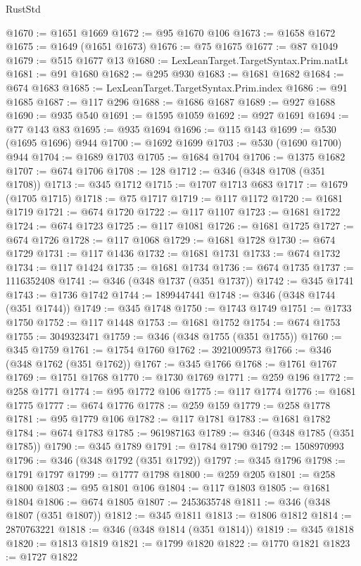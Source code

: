 \begin{lexlean}{RustStd}
\begin{coremodule}
@1670 := @1651 @1669
@1672 := @95 @1670 @106
@1673 := @1658 @1672
@1675 := @1649 (@1651 @1673)
@1676 := @75 @1675
@1677 := @87 @1049
@1679 := @515 @1677 @13
@1680 := LexLeanTarget.TargetSyntax.Prim.natLt
@1681 := @91 @1680
@1682 := @295 @930
@1683 := @1681 @1682
@1684 := @674 @1683
@1685 := LexLeanTarget.TargetSyntax.Prim.index
@1686 := @91 @1685
@1687 := @117 @296
@1688 := @1686 @1687
@1689 := @927 @1688
@1690 := @935 @540
@1691 := @1595 @1059
@1692 := @927 @1691
@1694 := @77 @143 @83
@1695 := @935 @1694
@1696 := @115 @143
@1699 := @530 (@1695 @1696) @944
@1700 := @1692 @1699
@1703 := @530 (@1690 @1700) @944
@1704 := @1689 @1703
@1705 := @1684 @1704
@1706 := @1375 @1682
@1707 := @674 @1706
@1708 := 128
@1712 := @346 (@348 @1708 (@351 @1708))
@1713 := @345 @1712
@1715 := @1707 @1713 @683
@1717 := @1679 (@1705 @1715)
@1718 := @75 @1717
@1719 := @117 @1172
@1720 := @1681 @1719
@1721 := @674 @1720
@1722 := @117 @1107
@1723 := @1681 @1722
@1724 := @674 @1723
@1725 := @117 @1081
@1726 := @1681 @1725
@1727 := @674 @1726
@1728 := @117 @1068
@1729 := @1681 @1728
@1730 := @674 @1729
@1731 := @117 @1436
@1732 := @1681 @1731
@1733 := @674 @1732
@1734 := @117 @1424
@1735 := @1681 @1734
@1736 := @674 @1735
@1737 := 1116352408
@1741 := @346 (@348 @1737 (@351 @1737))
@1742 := @345 @1741
@1743 := @1736 @1742
@1744 := 1899447441
@1748 := @346 (@348 @1744 (@351 @1744))
@1749 := @345 @1748
@1750 := @1743 @1749
@1751 := @1733 @1750
@1752 := @117 @1448
@1753 := @1681 @1752
@1754 := @674 @1753
@1755 := 3049323471
@1759 := @346 (@348 @1755 (@351 @1755))
@1760 := @345 @1759
@1761 := @1754 @1760
@1762 := 3921009573
@1766 := @346 (@348 @1762 (@351 @1762))
@1767 := @345 @1766
@1768 := @1761 @1767
@1769 := @1751 @1768
@1770 := @1730 @1769
@1771 := @259 @196
@1772 := @258 @1771
@1774 := @95 @1772 @106
@1775 := @117 @1774
@1776 := @1681 @1775
@1777 := @674 @1776
@1778 := @259 @159
@1779 := @258 @1778
@1781 := @95 @1779 @106
@1782 := @117 @1781
@1783 := @1681 @1782
@1784 := @674 @1783
@1785 := 961987163
@1789 := @346 (@348 @1785 (@351 @1785))
@1790 := @345 @1789
@1791 := @1784 @1790
@1792 := 1508970993
@1796 := @346 (@348 @1792 (@351 @1792))
@1797 := @345 @1796
@1798 := @1791 @1797
@1799 := @1777 @1798
@1800 := @259 @205
@1801 := @258 @1800
@1803 := @95 @1801 @106
@1804 := @117 @1803
@1805 := @1681 @1804
@1806 := @674 @1805
@1807 := 2453635748
@1811 := @346 (@348 @1807 (@351 @1807))
@1812 := @345 @1811
@1813 := @1806 @1812
@1814 := 2870763221
@1818 := @346 (@348 @1814 (@351 @1814))
@1819 := @345 @1818
@1820 := @1813 @1819
@1821 := @1799 @1820
@1822 := @1770 @1821
@1823 := @1727 @1822

\end{coremodule}
\end{lexlean}

